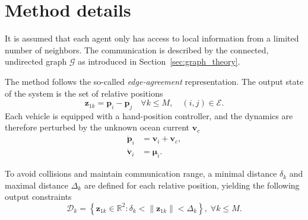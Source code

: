 \section{Method details}\label{sec:consensus_method}
It is assumed that each agent only has access to local information from a limited number of neighbors. The communication is described by the connected, undirected graph $\mathcal{G}$ as introduced in Section~\ref{sec:graph_theory}.

The method follows the so-called \textit{edge-agreement} representation. The output state of the system is the set of relative positions
\begin{equation}
    \mathbf{z}_{1k} = \mathbf{p}_i - \mathbf{p}_j \quad \forall k \leq M, \quad (i,j) \in \mathcal{E}.
\end{equation}
Each vehicle is equipped with a hand-position controller, and the dynamics are therefore perturbed by the unknown ocean current $\mathbf{v}_c$
\begin{subequations}
\begin{align}
    \dot{\mathbf{p}}_i &= \mathbf{v}_i +\mathbf{v}_c,\\
    \dot{\mathbf{v}}_i &= \bm{\mu}_i.
\end{align}
\end{subequations}

To avoid collisions and maintain communication range, a minimal distance $\delta_k$ and maximal distance $\Delta_k$ are defined for each relative position, yielding the following output constraints
\begin{equation}
    \mathcal{D}_k = \left\{\mathbf{z}_{1k} \in \mathbb  {R}^2 \colon \delta_k < \| \mathbf{z}_{1k} \| < \Delta_k \right\}, \; \forall k \leq M.\label{eq:restrepo_constraints}
\end{equation}

